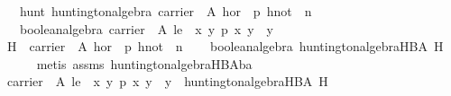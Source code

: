\begin{isabellebody}
\ \ \ hunt{}\ {}huntington{}algebra\ {}carrier\ {}\ A{}\ hor\ {}\ p{}\ hnot\ {}\ n{}{}\isanewline
\ \ \ {}boolean{}algebra\ {}carrier\ {}\ A{}\ le\ {}\ {}{}x\ y{}\ p\ x\ y\ {}\ y{}{}{}\isanewline
%
\isadelimproof
%
\endisadelimproof
%
\isatagproof
{}\isamarkupfalse%
\ {}\isanewline
\ \ \isamarkupfalse%
\ {}H\ {}\ {}{}carrier\ {}\ A{}\ hor\ {}\ p{}\ hnot\ {}\ n{}{}\isanewline
\isanewline
\ \ \isamarkupfalse%
\ {}boolean{}algebra\ {}huntington{}algebra{}HBA\ {}H{}{}\isanewline
\ \ \ \ \isamarkupfalse%
\ {}metis\ assms\ huntington{}algebra{}HBA{}ba{}\isanewline
\isanewline
\ \ \isamarkupfalse%
\ \isamarkupfalse%
\ {}{}carrier\ {}\ A{}\ le\ {}\ {}{}x\ y{}\ p\ x\ y\ {}\ y{}{}\ {}\ huntington{}algebra{}HBA\ {}H{}\isanewline

\end{isabellebody}
